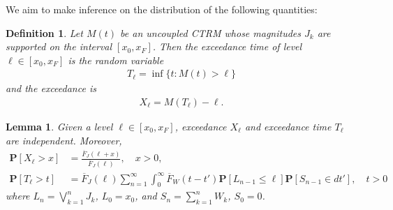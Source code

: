 \documentclass[12pt]{article}
\newtheorem{lemma}[theorem]{Lemma}
\newtheorem{definition}[theorem]{Definition}
\theoremstyle{definition}
\theoremstyle{remark}
\numberwithin{equation}{section}
\newcommand{\pr}{\mathbf {P}}
\newcommand{\1}{\mathbf 1}
\begin{document}
We aim to make inference on the distribution of the following quantities:
\begin{definition}
Let $M(t)$ be an uncoupled CTRM whose magnitudes $J_k$ are supported on the interval
$[x_0, x_F]$.  Then the exceedance time of level $\ell \in [x_0,x_F]$ is
the random variable
\begin{align*}
T_\ell = \inf\{t: M(t) > \ell\}
\end{align*}
and the exceedance is 
\begin{align*}
X_\ell = M(T_\ell) - \ell.
\end{align*}
\end{definition}

\begin{lemma}
Given a level $\ell \in [x_0,x_F]$, exceedance $X_\ell$ and exceedance time
$T_\ell$ are independent. Moreover, 
\begin{align*}
\pr[X_\ell > x]
&= \frac{\overline F_J(\ell + x)}{\overline F_J(\ell)}, \quad x > 0,
\\
\pr[T_\ell > t]
&= \overline F_J(\ell) \sum_{n=1}^\infty \int_0^\infty \overline F_W(t-t') \pr[L_{n-1} \le \ell]
\pr[S_{n-1} \in dt'], \quad t > 0
\end{align*}
where $L_n = \bigvee_{k=1}^n J_k$, $L_0 = x_0$, and $S_n = \sum_{k=1}^n W_k$,
$S_0 = 0$.
\end{lemma}
\end{document}
